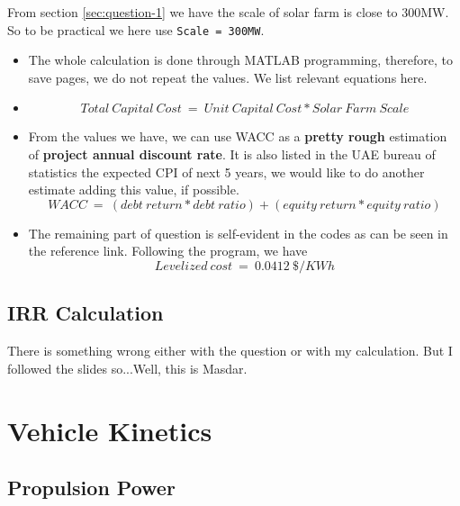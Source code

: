 \documentclass[12pt]{article}
\begin{document}
From section \ref{sec:question-1} we have the scale of solar farm is
close to 300MW. So to be practical we here use \texttt{Scale =
  300MW}.
\begin{itemize}
\item The whole calculation is done through MATLAB programming,
  therefore, to save pages, we do not repeat the values. We list
  relevant equations here.
\item
  \begin{equation}
    \label{eq:12}
    Total~Capital~Cost~=~Unit~Capital~Cost * Solar~Farm~Scale
  \end{equation}
\item From the values we have, we can use WACC as a \textbf{pretty
    rough} estimation of \textbf{project annual discount rate}. It is
  also listed in the UAE bureau of statistics the expected CPI of next
  5 years, we would like to do another estimate adding this value, if
  possible. 
  \begin{equation}
    \label{eq:13}
    WACC~=~(debt~return*debt~ratio)+(equity~return*equity~ratio)
  \end{equation}
\item The remaining part of question is self-evident in the codes as
  can be seen in the reference link. Following the program, we have
  \begin{equation}
    \label{eq:14}
    Levelized~cost~=~0.0412~\$/KWh
  \end{equation}

\end{itemize}

\subsection{IRR Calculation}
\label{sec:irr-calculation}

There is something wrong either with the question or with my
calculation. But I followed the slides so...Well, this is Masdar.


\section{Vehicle Kinetics}
\label{sec:vehicle-kinetics}

\subsection{Propulsion Power}
\label{sec:propulsion-power}
\end{document}
